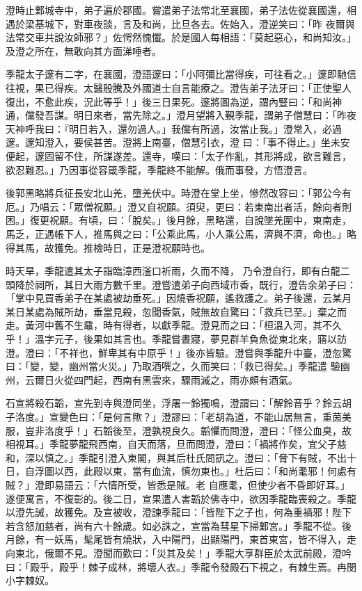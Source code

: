 \begin{pinyinscope}
 澄時止鄴城寺中，弟子遍於郡國。嘗遣弟子法常北至襄國，弟子法佐從襄國還，相遇於梁基城下，對車夜談，言及和尚，比旦各去。佐始入，澄逆笑曰：「昨
 夜爾與法常交車共說汝師邪？」佐愕然愧懺。於是國人每相語：「莫起惡心，和尚知汝。」及澄之所在，無敢向其方面涕唾者。



 季龍太子邃有二字，在襄國，澄語邃曰：「小阿彌比當得疾，可往看之。」邃即馳信往視，果已得疾。太醫殷騰及外國道士自言能療之。澄告弟子法牙曰：「正使聖人復出，不愈此疾，況此等乎！」後三日果死。邃將圖為逆，謂內豎曰：「和尚神通，儻發吾謀。明日來者，當先除之。」澄月望將入覲季龍，謂弟子僧慧曰：「昨夜天神呼我曰：『明日若入，還勿過人。」我儻有所過，汝當止我。」澄常入，必過邃。邃知澄入，要侯甚苦。澄將上南臺，僧慧引衣，澄
 曰：「事不得止。」坐未安便起，邃固留不住，所謀遂差。還寺，嘆曰：「太子作亂，其形將成，欲言難言，欲忍難忍。」乃因事從容箴季龍，季龍終不能解。俄而事發，方悟澄言。



 後郭黑略將兵征長安北山羌，墮羌伏中。時澄在堂上坐，慘然改容曰：「郭公今有厄。」乃唱云：「眾僧祝願。」澄又自祝願。須臾，更曰：若東南出者活，餘向者則困。」復更祝願。有頃，曰：「脫矣。」後月餘，黑略還，自說墜羌圍中，東南走，馬乏，正遇帳下人，推馬與之曰：「公乘此馬，小人乘公馬，濟與不濟，命也。」略得其馬，故獲免。推檢時日，正是澄祝願時也。



 時天旱，季龍遣其太子詣臨漳西滏口祈雨，久而不降，
 乃令澄自行，即有白龍二頭降於祠所，其日大雨方數千里。澄嘗遣弟子向西域市香，既行，澄告余弟子曰：「掌中見買香弟子在某處被劫垂死。」因燒香祝願，遙救護之。弟子後還，云某月某日某處為賊所劫，垂當見殺，忽聞香氣，賊無故自驚曰：「救兵已至。」棄之而走。黃河中舊不生黿，時有得者，以獻季龍。澄見而之曰：「桓溫入河，其不久乎！」溫字元子，後果如其言也。季龍嘗晝寢，夢見群羊負魚從東北來，寤以訪澄。澄曰：「不祥也，鮮卑其有中原乎！」後亦皆驗。澄嘗與季龍升中臺，澄忽驚曰：「變，變，幽州當火災。」乃取酒噀之，久而笑曰：「救已得矣。」季龍遣
 驗幽州，云爾日火從四門起，西南有黑雲來，驟雨滅之，雨亦頗有酒氣。



 石宣將殺石韜，宣先到寺與澄同坐，浮屠一鈴獨鳴，澄謂曰：「解鈴音乎？鈴云胡子洛度。」宣變色曰：「是何言歟？」澄謬曰：「老胡為道，不能山居無言，重茵美服，豈非洛度乎！」石韜後至，澄孰視良久。韜懼而問澄，澄曰：「怪公血臭，故相視耳。」季龍夢龍飛西南，自天而落，旦而問澄，澄曰：「禍將作矣，宜父子慈和，深以慎之。」季龍引澄入東閣，與其后杜氏問訊之。澄曰：「脅下有賊，不出十日，自浮圖以西，此殿以東，當有血流，慎勿東也。」杜后曰：「和尚耄邪！何處有賊？」澄即易語云：「六情所受，皆悉是賊。老
 自應耄，但使少者不昏即好耳。」遂便寓言，不復彰的。後二日，宣果遣人害韜於佛寺中，欲因季龍臨喪殺之。季龍以澄先誡，故獲免。及宣被收，澄諫季龍曰：「皆陛下之子也，何為重禍邪！陛下若含怒加慈者，尚有六十餘歲。如必誅之，宣當為彗星下掃鄴宮。」季龍不從。後月餘，有一妖馬，髦尾皆有燒狀，入中陽門，出顯陽門，東首東宮，皆不得入，走向東北，俄爾不見。澄聞而歎曰：「災其及矣！」季龍大享群臣於太武前殿，澄吟曰：「殿乎，殿乎！棘子成林，將壞人衣。」季龍令發殿石下視之，有棘生焉。冉閔小字棘奴。



\end{pinyinscope}
